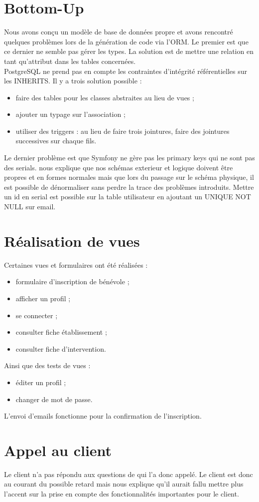 \documentclass [a4paper] {article}
\begin{document}
\section{Bottom-Up}
Nous avons conçu un modèle de base de données propre et avons rencontré quelques problèmes lors de la génération de code via l'ORM. Le premier est que ce dernier ne semble pas gérer les types. La solution est de mettre une relation en tant qu'attribut dans les tables concernées. \\
PostgreSQL ne prend pas en compte les contraintes d'intégrité référentielles sur les INHERITS. Il y a trois solution possible :
\begin{itemize}
\item faire des tables pour les classes abstraites au lieu de vues ;
\item ajouter un typage sur l'association ;
\item utiliser des triggers : au lieu de faire trois jointures, faire des jointures successives sur chaque fils.
\end{itemize}

Le dernier problème est que Symfony ne gère pas les primary keys qui ne sont pas des serials. \nomTuteurPedago{} nous explique que nos schémas exterieur et logique doivent être propres et en formes normales mais que lors du passage sur le schéma physique, il est possible de dénormaliser sans perdre la trace des problèmes introduits. Mettre un id en serial est possible sur la table utilisateur en ajoutant un UNIQUE NOT NULL sur email.

\section{Réalisation de vues}
Certaines vues et formulaires ont été réalisées :
\begin{itemize}
\item formulaire d'inscription de bénévole ;
\item afficher un profil ;
\item se connecter ;
\item consulter fiche établissement ;
\item consulter fiche d'intervention.
\end{itemize}
Ainsi que des tests de vues : 
\begin{itemize}
\item éditer un profil ;
\item changer de mot de passe.
\end{itemize}

L'envoi d'emails fonctionne pour la confirmation de l'inscription.

\section{Appel au client}
Le client n'a pas répondu aux questions de \Sergi{} qui l'a donc appelé. Le client est donc au courant du possible retard mais \nomTuteurPedago{} nous explique qu'il aurait fallu mettre plus l'accent sur la prise en compte des fonctionnalités importantes pour le client.


\newpage
\end{document}
